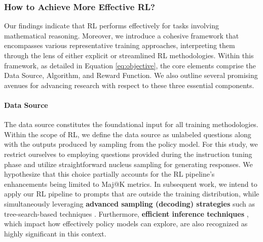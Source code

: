 \begin{itemize}[topsep=0pt]
\begin{itemize}[topsep=0pt]
\subsubsection{How to Achieve More Effective RL?}
\label{sec:effec_rl}
Our findings indicate that RL performs effectively for tasks involving mathematical reasoning. Moreover, we introduce a cohesive framework that encompasses various representative training approaches, interpreting them through the lens of either explicit or streamlined RL methodologies. Within this framework, as detailed in Equation \ref{eq:objective}, the core elements comprise the Data Source, Algorithm, and Reward Function. We also outline several promising avenues for advancing research with respect to these three essential components.

\paragraph{Data Source} The data source constitutes the foundational input for all training methodologies. Within the scope of RL, we define the data source as unlabeled questions along with the outputs produced by sampling from the policy model. For this study, we restrict ourselves to employing questions provided during the instruction tuning phase and utilize straightforward nucleus sampling for generating responses. We hypothesize that this choice partially accounts for the RL pipeline's enhancements being limited to Maj@K metrics. In subsequent work, we intend to apply our RL pipeline to prompts that are outside the training distribution, while simultaneously leveraging \textbf{advanced sampling (decoding) strategies} such as tree-search-based techniques \citep{yao2023tree}. Furthermore, \textbf{efficient inference techniques} \citep{xia-etal-2023-speculative,leviathan2023fast,kwon2023efficient,xia2024unlocking}, which impact how effectively policy models can explore, are also recognized as highly significant in this context.


\end{itemize}
\end{itemize}
